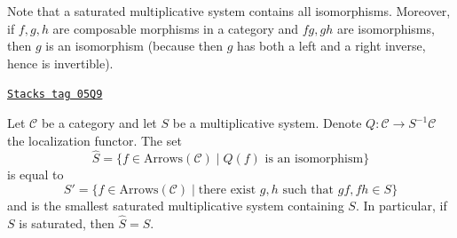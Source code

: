 Note that a saturated multiplicative system contains all isomorphisms.
Moreover, if $f, g, h$ are composable morphisms in a category and
$fg, gh$ are isomorphisms, then $g$ is an isomorphism (because then $g$
has both a left and a right inverse, hence is invertible).

\begin{lemma}
\label{categories-lemma-what-gets-inverted}
\href{https://stacks.math.columbia.edu/tag/05Q9}{\texttt{Stacks tag 05Q9}}

Let $\mathcal{C}$ be a category and let $S$ be a multiplicative system.
Denote $Q : \mathcal{C} \to S^{-1}\mathcal{C}$ the localization functor.
The set
$$
\hat S = \{f \in \text{Arrows}(\mathcal{C}) \mid
Q(f) \text{ is an isomorphism}\}
$$
is equal to
$$
S' = \{f \in \text{Arrows}(\mathcal{C}) \mid
\text{there exist }g, h\text{ such that }gf, fh \in S\}
$$
and is the smallest saturated multiplicative system containing $S$.
In particular, if $S$ is saturated, then $\hat S = S$.
\end{lemma}

